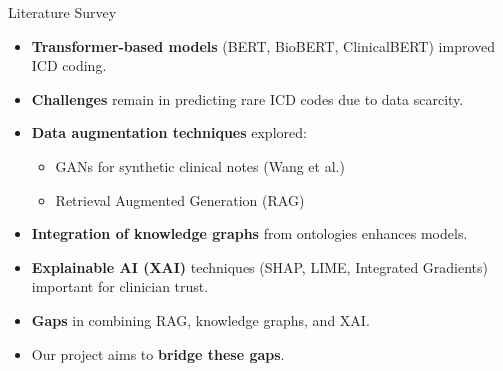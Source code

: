 \documentclass{beamer}
\begin{document}
\begin{frame}{Literature Survey}
    \begin{itemize}
        \item \textbf{Transformer-based models} (BERT, BioBERT, ClinicalBERT) improved ICD coding.
        \item \textbf{Challenges} remain in predicting rare ICD codes due to data scarcity.
        \item \textbf{Data augmentation techniques} explored:
        \begin{itemize}
            \item GANs for synthetic clinical notes (Wang et al.)
            \item Retrieval Augmented Generation (RAG)
        \end{itemize}
        \item \textbf{Integration of knowledge graphs} from ontologies enhances models.
        \item \textbf{Explainable AI (XAI)} techniques (SHAP, LIME, Integrated Gradients) important for clinician trust.
        \item \textbf{Gaps} in combining RAG, knowledge graphs, and XAI.
        \item Our project aims to \textbf{bridge these gaps}.
    \end{itemize}
\end{frame}
\end{document}
